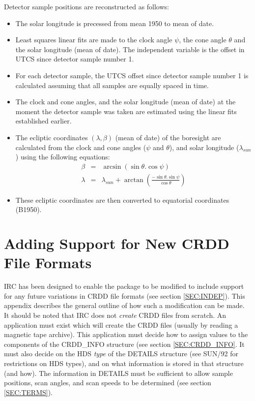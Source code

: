 Detector sample positions are reconstructed as follows:
\begin{itemize}
\item The solar longitude is precessed from mean 1950 to mean of date. 
\item Least squares linear fits are made to the clock angle $\psi$, the cone
angle $\theta$ and the solar longitude (mean of date). The independent variable 
is the offset in UTCS since detector sample number 1.
\item For each detector sample, the UTCS offset since detector sample number 1 is
calculated assuming that all samples are equally spaced in time. 
\item The clock and cone angles, and the solar longitude (mean of date) at the 
moment the detector sample was taken are estimated using the linear fits 
established earlier.
\item The ecliptic coordinates $(\lambda,\beta)$ (mean of date) of the boresight
are calculated from the clock and cone angles ($\psi$ and $\theta$), and solar
longitude ($\lambda_{sun}$) using the following equations: 
\begin{eqnarray*}
\beta & = & \arcsin( \sin \theta. \cos \psi )\\
\lambda & = & \lambda_{sun} + \arctan \left(\frac{-\sin \theta.\sin \psi}{\cos 
\theta} \right)
\end{eqnarray*}
\item These ecliptic coordinates are then converted to equatorial coordinates 
(B1950).
\end{itemize}

\section {Adding Support for New CRDD File Formats}
IRC has been designed to enable the package to be modified to include support 
for any future variations in CRDD file formats (see section \ref {SEC:INDEP}).
This appendix describes the general outline of how such a modification can be 
made. It should be noted that IRC does not {\em create} CRDD files from 
scratch. An application must exist which will create the CRDD files (usually
by reading a magnetic tape archive). This application must decide how to 
assign values  to the components of the CRDD\_INFO structure (see section
\ref{SEC:CRDD_INFO}. It must also decide on the HDS {\em type} of the DETAILS 
structure (see SUN/92 for restrictions on HDS types), and on what information 
is stored in that structure (and how). The
information in DETAILS must be sufficient to allow sample positions, scan
angles, and scan speeds to be determined (see section \ref{SEC:TERMS}).

